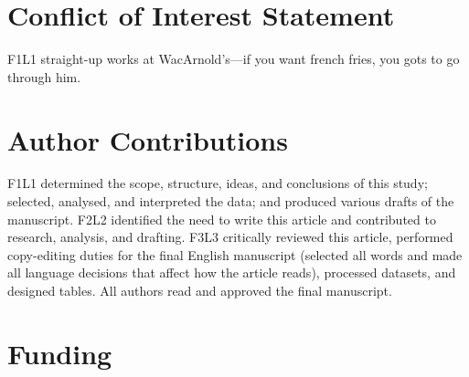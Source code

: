 \documentclass[utf8]{FrontiersinVancouver}   %
\begin{document}


\section*{Conflict of Interest Statement}

F1L1 straight-up works at WacArnold's---if you want french fries, you gots to go through him.

\section*{Author Contributions}

F1L1 determined the scope, structure, ideas, and conclusions of this study; selected, analysed, and
interpreted the data; and produced various drafts of the manuscript. F2L2 identified the need to
write this article and contributed to research, analysis, and drafting. F3L3 critically reviewed
this article, performed copy-editing duties for the final English manuscript (selected all words
and made all language decisions that affect how the article reads), processed datasets, and
designed tables. All authors read and approved the final manuscript.

\section*{Funding}
\end{document}
